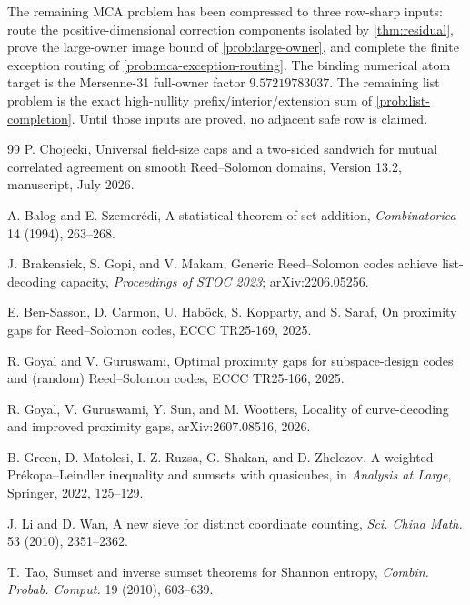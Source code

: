 \documentclass[11pt,a4paper]{amsart}
\numberwithin{equation}{section}
\theoremstyle{remark}
\begin{document}
The remaining MCA problem has been compressed to three row-sharp inputs: route the positive-dimensional correction components isolated by \cref{thm:residual}, prove the large-owner image bound of \cref{prob:large-owner}, and complete the finite exception routing of \cref{prob:mca-exception-routing}.  The binding numerical atom target is the Mersenne-31 full-owner factor $9.57219783037$.  The remaining list problem is the exact high-nullity prefix/interior/extension sum of \cref{prob:list-completion}.  Until those inputs are proved, no adjacent safe row is claimed.

\begin{thebibliography}{99}
P. Chojecki,
\newblock Universal field-size caps and a two-sided sandwich for mutual correlated agreement on smooth Reed--Solomon domains,
\newblock Version 13.2, manuscript, July 2026.

A. Balog and E. Szemer\'edi,
\newblock A statistical theorem of set addition,
\newblock \emph{Combinatorica} 14 (1994), 263--268.

J. Brakensiek, S. Gopi, and V. Makam,
\newblock Generic Reed--Solomon codes achieve list-decoding capacity,
\newblock \emph{Proceedings of STOC 2023}; arXiv:2206.05256.

E. Ben-Sasson, D. Carmon, U. Hab\"ock, S. Kopparty, and S. Saraf,
\newblock On proximity gaps for Reed--Solomon codes,
\newblock ECCC TR25-169, 2025.

R. Goyal and V. Guruswami,
\newblock Optimal proximity gaps for subspace-design codes and (random) Reed--Solomon codes,
\newblock ECCC TR25-166, 2025.

R. Goyal, V. Guruswami, Y. Sun, and M. Wootters,
\newblock Locality of curve-decoding and improved proximity gaps,
\newblock arXiv:2607.08516, 2026.

B. Green, D. Matolcsi, I. Z. Ruzsa, G. Shakan, and D. Zhelezov,
\newblock A weighted Pr\'ekopa--Leindler inequality and sumsets with quasicubes,
\newblock in \emph{Analysis at Large}, Springer, 2022, 125--129.

J. Li and D. Wan,
\newblock A new sieve for distinct coordinate counting,
\newblock \emph{Sci. China Math.} 53 (2010), 2351--2362.

T. Tao,
\newblock Sumset and inverse sumset theorems for Shannon entropy,
\newblock \emph{Combin. Probab. Comput.} 19 (2010), 603--639.


\end{thebibliography}
\end{document}
